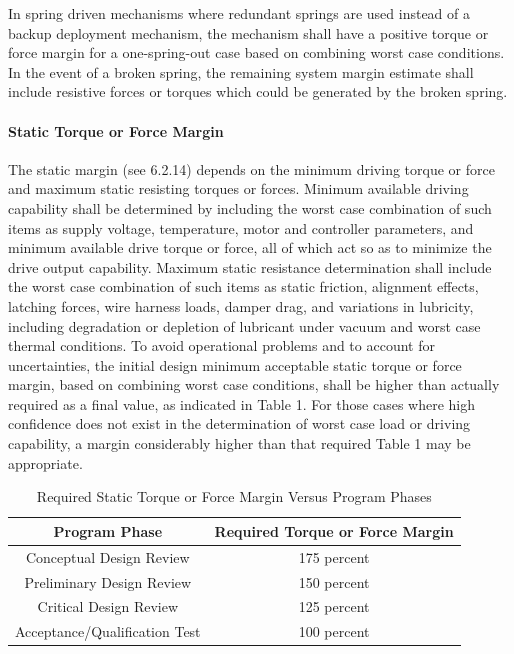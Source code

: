 \documentclass[12pt]{article}
\begin{document}
In spring driven mechanisms where redundant springs are used instead of a backup deployment mechanism, the mechanism shall have a positive torque or force margin for a one-spring-out case based on combining worst case conditions. 
In the event of a broken spring, the remaining system margin estimate shall include resistive forces or torques which could be generated by the broken spring.

\paragraph{Static Torque or Force Margin} %
The static margin (see 6.2.14) depends on the minimum driving torque or force and maximum static resisting torques or forces. 
Minimum available driving capability shall be determined by including the worst case combination of such items as supply voltage, temperature, motor and controller parameters, and minimum available drive torque or force, all of which act so as to minimize the drive output capability. 
Maximum static resistance determination shall include the worst case combination of such items as static friction, alignment effects, latching forces, wire harness loads, damper drag, and variations in lubricity, including degradation or depletion of lubricant under vacuum and worst case thermal conditions. 
To avoid operational problems and to account for uncertainties, the initial design minimum acceptable static torque or force margin, based on combining worst case conditions, shall be higher than actually required as a final value, as indicated in Table 1. 
For those cases where high confidence does not exist in the determination of worst case load or driving capability, a margin considerably higher than that required Table 1 may be appropriate.

\begin{table}[h!]
\centering
 \begin{tabular}{|c|c|} 
 \hline
 Program Phase &  Required Torque or Force Margin \\
 \hline
 Conceptual Design Review & 175 percent   \\ 
 Preliminary Design Review & 150 percent   \\
 Critical Design Review & 125 percent  \\
 Acceptance/Qualification Test & 100 percent  \\
 \hline
 \end{tabular}
\caption{Required Static Torque or Force Margin Versus Program Phases}
\label{table:1}
\end{table}
\end{document}
